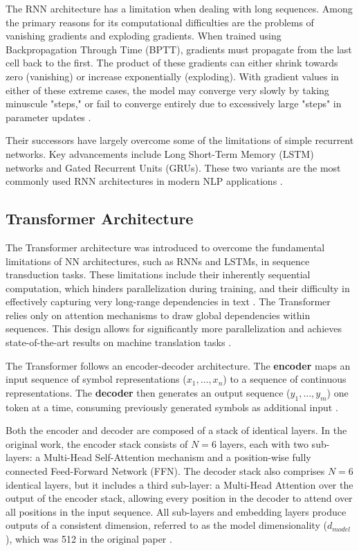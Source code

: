     The RNN architecture has a limitation when dealing with long sequences. Among the primary reasons for its computational difficulties are the problems of vanishing gradients and exploding gradients. When trained using Backpropagation Through Time (BPTT), gradients must propagate from the last cell back to the first. The product of these gradients can either shrink towards zero (vanishing) or increase exponentially (exploding). With gradient values in either of these extreme cases, the model may converge very slowly by taking minuscule "steps," or fail to converge entirely due to excessively large "steps" in parameter updates \cite{jm3_llm_book}.
    
    Their successors have largely overcome some of the limitations of simple recurrent networks. Key advancements include Long Short-Term Memory (LSTM) networks and Gated Recurrent Units (GRUs). These two variants are the most commonly used RNN architectures in modern NLP applications \cite{jm3_llm_book}.
    
\subsection{Transformer Architecture}

The Transformer architecture was introduced to overcome the fundamental limitations of NN architectures, such as RNNs and LSTMs, in sequence transduction tasks. These limitations include their inherently sequential computation, which hinders parallelization during training, and their difficulty in effectively capturing very long-range dependencies in text \cite{vaswani2017_attention_is_all}. The Transformer relies only on attention mechanisms to draw global dependencies within sequences. This design allows for significantly more parallelization and achieves state-of-the-art results on machine translation tasks \cite{jm3_llm_book, vaswani2017_attention_is_all}.

The Transformer follows an encoder-decoder architecture. The \textbf{encoder} maps an input sequence of symbol representations ($x_1, \ldots, x_n$) to a sequence of continuous representations. The \textbf{decoder} then generates an output sequence ($y_1, \ldots, y_m$) one token at a time, consuming previously generated symbols as additional input \cite{jm3_llm_book}.

Both the encoder and decoder are composed of a stack of identical layers. In the original work, the encoder stack consists of $N=6$ layers, each with two sub-layers: a Multi-Head Self-Attention mechanism and a position-wise fully connected Feed-Forward Network (FFN). The decoder stack also comprises $N=6$ identical layers, but it includes a third sub-layer: a Multi-Head Attention over the output of the encoder stack, allowing every position in the decoder to attend over all positions in the input sequence. All sub-layers and embedding layers produce outputs of a consistent dimension, referred to as the model dimensionality ($d_{model}$), which was 512 in the original paper \cite{vaswani2017_attention_is_all}.

